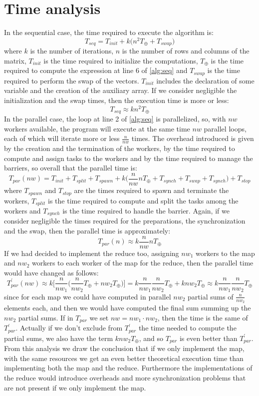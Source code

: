 \documentclass[12pt]{article}
\begin{document}
	\section{Time analysis}
	In the sequential case, the time required to execute the algorithm is:
	\[ T_{seq} = T_{init} + k\Big(n^2T_\oplus + T_{swap}\Big) \]
	where $k$ is the number of iterations, $n$ is the number of rows and columns of the matrix, $T_{init}$ is the time required to initialize the computations, $T_\oplus$ is the time required to compute the expression at line 6 of \ref{alg:seq} and $T_{swap}$ is the time required to perform the swap of the vectors. $T_{init}$ includes the declaration of some variable and the creation of the auxiliary array. If we consider negligible the initialization and the swap times, then the execution time is more or less: 
	\[ T_{seq} \approx kn^2T_\oplus \]
	In the parallel case, the loop at line 2 of \ref{alg:seq} is parallelized, so, with $nw$ workers available, the program will execute at the same time $nw$ parallel loops, each of which will iterate more or less $\frac{n}{nw}$ times. The overhead introduced is given by the creation and the termination of the workers, by the time required to compute and assign tasks to the workers and by the time required to manage the barriers, so overall that the parallel time is:
	\[T_{par}(nw) = T_{init} + T_{split} + T_{spawn} + k\Big(\frac{n}{nw}nT_\oplus + T_{synch} + T_{swap} + T_{synch}\Big) + T_{stop} \]
	where $T_{spawn}$ and $T_{stop}$ are the times required to spawn and terminate the workers, $T_{split}$ is the time required to compute and split the tasks among the workers and $T_{synch}$ is the time required to handle the barrier. Again, if we consider negligible the times required for the preparations, the synchronization and the swap, then the parallel time is approximately:
	\[T_{par}(n) \approx k\frac{n}{nw}nT_\oplus \]
	If we had decided to implement the reduce too, assigning $nw_1$ workers to the map and $nw_2$ workers to each worker of the map for the reduce, then the parallel time would have changed as follows:
	\[ T^\prime_{par}(nw) \approx k\Big[\frac{n}{nw_1}\Big(\frac{n}{nw_2}T_\oplus + nw_2T_\oplus \Big) \Big] = k\frac{n}{nw_1}\frac{n}{nw_2}T_\oplus + knw_2T_\oplus \approx k\frac{n}{nw_1}\frac{n}{nw_2}T_\oplus \]
	since for each map we could have computed in parallel $nw_2$ partial sums of $\frac{n}{nw_2}$ elements each, and then we would have computed the final sum summing up the $nw_2$ partial sums. If in $T_{par}$ we set $nw = nw_1\cdot nw_2$, then the time is the same of $T^\prime_{par}$. Actually if we don't exclude from $T^\prime_{par}$ the time needed to compute the partial sums, we also have the term $k nw_2T_\oplus$, and so $T_{par}$ is even better than $T^\prime_{par}$. From this analysis we draw the conclusion that if we only implement the map, with the same resources we get an even better theoretical execution time than implementing both the map and the reduce. Furthermore the implementations of the reduce would introduce overheads and more synchronization problems that are not present if we only implement the map.\\
\end{document}
